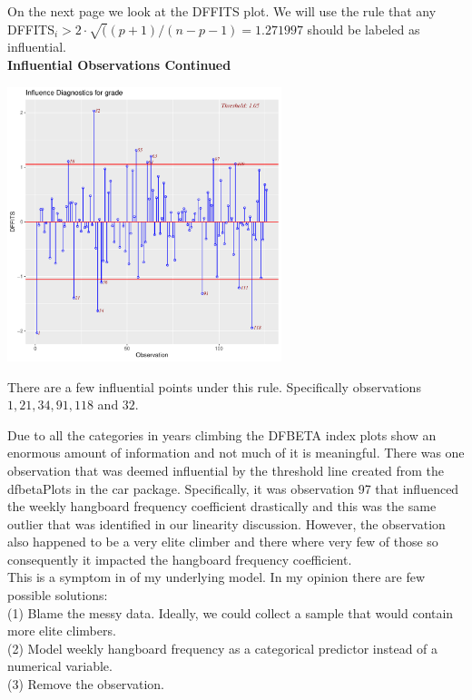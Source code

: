 \documentclass[11pt]{amsart}
\newcommand{\tab}{\hspace*{.75cm}}
\begin{document}
On the next page we look at the DFFITS plot. We will use the rule that any DFFITS$_i > 2 \cdot \sqrt((p +1)/(n-p-1) = 1.271997$ should be labeled as influential. \\

\newpage
{\bf Influential Observations Continued}\\
\begin{center}
\includegraphics[width=0.6\textwidth]{15.pdf}
\end{center}
\vspace{0.15in}

There are a few influential points under this rule. Specifically observations $1, 21, 34, 91, 118$ and $32$.

Due to all the categories in years climbing the DFBETA index plots show an enormous amount of information and not much of it is meaningful. There was one observation that was deemed influential by the threshold line created from the dfbetaPlots in the car package. Specifically, it was observation 97 that influenced the weekly hangboard frequency coefficient drastically and this was the same outlier that was identified in our linearity discussion. However, the observation also happened to be a very elite climber and there where very few of those so consequently it impacted the hangboard frequency coefficient.\\

This is a symptom in of my underlying model. In my opinion there are few possible solutions:\\
\tab (1) Blame the messy data. Ideally, we could collect a sample that would contain more elite climbers.\\
\tab (2) Model weekly hangboard frequency as a categorical predictor instead of a numerical variable.\\
\tab (3) Remove the observation.\\
\end{document}

